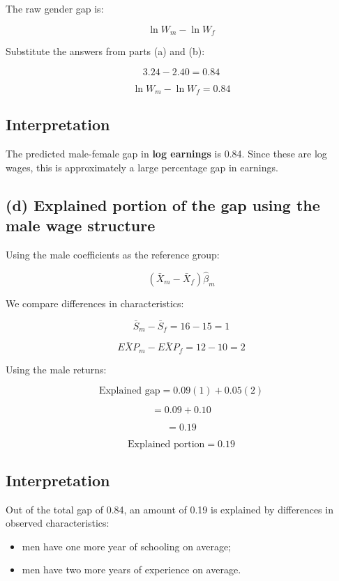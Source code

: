 \documentclass[12pt]{article}
\begin{document}
The raw gender gap is:

\[
\ln W_m - \ln W_f
\]

Substitute the answers from parts (a) and (b):

\[
3.24 - 2.40 = 0.84
\]

\[
\boxed{\ln W_m - \ln W_f = 0.84}
\]

\subsection*{Interpretation}

The predicted male-female gap in \textbf{log earnings} is 0.84. Since these are log wages, this is approximately a large percentage gap in earnings.

\vspace{0.8em}

\subsection*{(d) Explained portion of the gap using the male wage structure}

Using the male coefficients as the reference group:

\[
(\bar{X}_m - \bar{X}_f)\hat{\beta}_m
\]

We compare differences in characteristics:

\[
\bar{S}_m - \bar{S}_f = 16 - 15 = 1
\]

\[
\bar{EXP}_m - \bar{EXP}_f = 12 - 10 = 2
\]

Using the male returns:

\[
\text{Explained gap} = 0.09(1) + 0.05(2)
\]

\[
= 0.09 + 0.10
\]

\[
= 0.19
\]

\[
\boxed{\text{Explained portion} = 0.19}
\]

\subsection*{Interpretation}

Out of the total gap of 0.84, an amount of 0.19 is explained by differences in observed characteristics:

\begin{itemize}
    \item men have one more year of schooling on average;
    \item men have two more years of experience on average.
\end{itemize}
\end{document}
